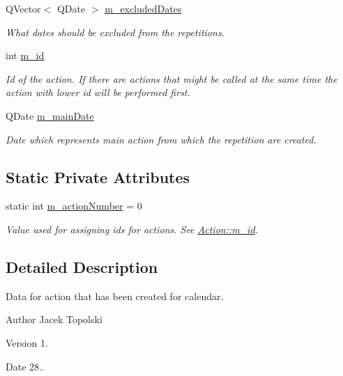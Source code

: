 \begin{DoxyCompactItemize}
Q\-Vector$<$ Q\-Date $>$ \hyperlink{class_action_a15acdea3b4df51d6c10d4870797a165b}{m\-\_\-excluded\-Dates}
\begin{DoxyCompactList}\small\item\em What dates should be excluded from the repetitions. \end{DoxyCompactList}\item 
int \hyperlink{class_action_a0f56dba599957c8a66d808c525cbd243}{m\-\_\-id}
\begin{DoxyCompactList}\small\item\em Id of the action. If there are actions that might be called at the same time the action with lower id will be performed first. \end{DoxyCompactList}\item 
Q\-Date \hyperlink{class_action_abb545fb5aae40e818ae95b44d56d7478}{m\-\_\-main\-Date}
\begin{DoxyCompactList}\small\item\em Date which represents main action from which the repetition are created. \end{DoxyCompactList}\end{DoxyCompactItemize}
\subsection*{Static Private Attributes}
\begin{DoxyCompactItemize}
\item 
static int \hyperlink{class_action_a00188e362b7f6b7740f514a7464e8eb2}{m\-\_\-action\-Number} = 0
\begin{DoxyCompactList}\small\item\em Value used for assigning ids for actions. See \hyperlink{class_action_a0f56dba599957c8a66d808c525cbd243}{Action\-::m\-\_\-id}. \end{DoxyCompactList}\end{DoxyCompactItemize}


\subsection{Detailed Description}
Data for action that has been created for calendar. 

\begin{DoxyAuthor}{Author}
Jacek Topolski 
\end{DoxyAuthor}
\begin{DoxyVersion}{Version}
1. 
\end{DoxyVersion}
\begin{DoxyDate}{Date}
28.. 
\end{DoxyDate}


